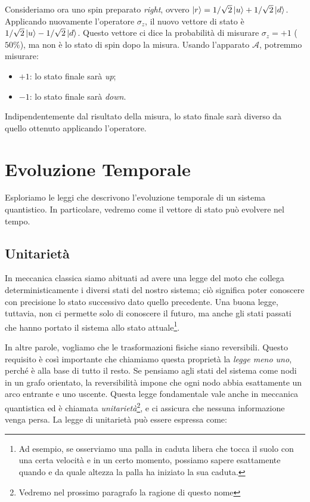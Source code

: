 Consideriamo ora uno spin preparato \emph{right}, ovvero $\Ket{r}= {1}/{\sqrt{2}}\Ket{u} + {1}/{\sqrt{2}}\Ket{d}$. Applicando nuovamente l'operatore $\sigma_z$, il nuovo vettore di stato è ${1}/{\sqrt{2}}\Ket{u} - {1}/{\sqrt{2}}\Ket{d}$. Questo vettore ci dice la probabilità di misurare $\sigma_z = +1$ ($50\%$), ma non è lo stato di spin dopo la misura. Usando l'apparato $\mathcal{A}$, potremmo misurare:
\begin{itemize}
	\item $+1$: lo stato finale sarà \emph{up};
	\item $-1$: lo stato finale sarà \emph{down}.
\end{itemize} 
Indipendentemente dal risultato della misura, lo stato finale sarà diverso da quello ottenuto applicando l'operatore.

\section{Evoluzione Temporale}\label{sec:temp_evol}
Esploriamo le leggi che descrivono l'evoluzione temporale di un sistema quantistico. In particolare, vedremo come il vettore di stato può evolvere nel tempo.

\subsection{Unitarietà}
In meccanica classica siamo abituati ad avere una legge del moto che collega deterministicamente i diversi stati del nostro sistema; ciò significa poter conoscere con precisione lo stato successivo dato quello precedente. Una buona legge, tuttavia, non ci permette solo di conoscere il futuro, ma anche gli stati passati che hanno portato il sistema allo stato attuale\footnote{Ad esempio, se osserviamo una palla in caduta libera che tocca il suolo con una certa velocità e in un certo momento, possiamo sapere esattamente quando e da quale altezza la palla ha iniziato la sua caduta.}. 

In altre parole, vogliamo che le trasformazioni fisiche siano reversibili. Questo requisito è così importante che chiamiamo questa proprietà la \emph{legge meno uno}, perché è alla base di tutto il resto. Se pensiamo agli stati del sistema come nodi in un grafo orientato, la reversibilità impone che ogni nodo abbia esattamente un arco entrante e uno uscente. Questa legge fondamentale vale anche in meccanica quantistica ed è chiamata \emph{unitarietà}\footnote{Vedremo nel prossimo paragrafo la ragione di questo nome}, e ci assicura che nessuna informazione venga persa. La legge di unitarietà può essere espressa come:

